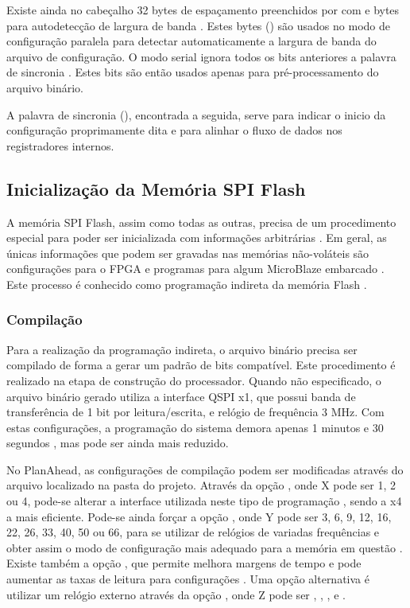 \documentclass[11pt,a4paper,oneside]{book}
\begin{document}
Existe ainda no cabeçalho 32 bytes de espaçamento preenchidos por com  e bytes para autodetecção de largura de banda \cite{ug470, xapp583}.
Estes bytes () são usados no modo de configuração paralela para detectar automaticamente a largura de banda do arquivo de configuração.
O modo serial ignora todos os bits anteriores a palavra de sincronia \cite{xapp583}.
Estes bits são então usados apenas para pré-processamento do arquivo binário.

A palavra de sincronia (), encontrada a seguida, serve para indicar o inicio da configuração proprimamente dita e para alinhar o fluxo de dados nos registradores internos.

\subsection{Inicialização da Memória SPI Flash}
\label{sec:flash_indireta}
A memória SPI Flash, assim como todas as outras, precisa de um procedimento especial para poder ser inicializada com informações arbitrárias \cite{xapp694}.
Em geral, as únicas informações que podem ser gravadas nas memórias não-voláteis são configurações para o FPGA e programas para algum MicroBlaze embarcado \cite{ug111}.
Este processo é conhecido como programação indireta da memória Flash \cite{xapp586}.

\subsubsection{Compilação} Para a realização da programação indireta, o arquivo binário precisa ser compilado de forma a gerar um padrão de bits compatível.
Este procedimento é realizado na etapa de construção do processador.
Quando não especificado, o arquivo binário gerado utiliza a interface QSPI x1, que possui banda de transferência de 1 bit por leitura/escrita,  e relógio de frequência 3 MHz.
Com estas configurações, a programação do sistema demora apenas 1 minutos e 30 segundos \cite{xapp586}, mas pode ser ainda mais reduzido.

No PlanAhead, as configurações de compilação podem ser modificadas através do arquivo  localizado na pasta  do projeto.
Através da opção , onde X pode ser 1, 2 ou 4, pode-se alterar a interface utilizada neste tipo de programação \cite{ug628, xapp586}, sendo a x4 a mais eficiente.
Pode-se ainda forçar a opção , onde Y pode ser 3, 6, 9, 12, 16, 22, 26, 33, 40, 50 ou 66, para se utilizar de relógios de variadas frequências e obter assim o modo de configuração mais adequado para a memória em questão \cite{xapp586, ug628, ug810}.
Existe também a opção , que permite melhora margens de tempo e pode aumentar as taxas de leitura para configurações \cite{ug628, ug586}.
Uma opção alternativa é utilizar um relógio externo através da opção , onde Z pode ser , , ,  e .
\end{document}
